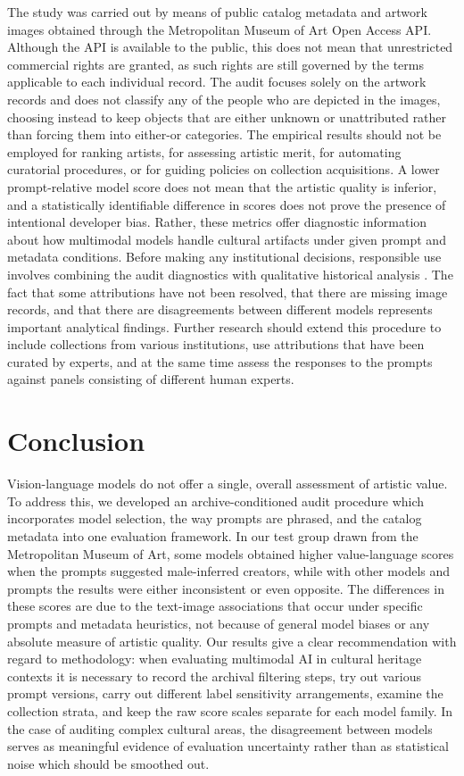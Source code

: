 \documentclass[pdflatex,sn-basic,Numbered]{sn-jnl}
\begin{document}
The study was carried out by means of public catalog metadata and artwork images obtained through the Metropolitan Museum of Art Open Access API. Although the API is available to the public, this does not mean that unrestricted commercial rights are granted, as such rights are still governed by the terms applicable to each individual record. The audit focuses solely on the artwork records and does not classify any of the people who are depicted in the images, choosing instead to keep objects that are either unknown or unattributed rather than forcing them into either-or categories.
The empirical results should not be employed for ranking artists, for assessing artistic merit, for automating curatorial procedures, or for guiding policies on collection acquisitions. A lower prompt-relative model score does not mean that the artistic quality is inferior, and a statistically identifiable difference in scores does not prove the presence of intentional developer bias. Rather, these metrics offer diagnostic information about how multimodal models handle cultural artifacts under given prompt and metadata conditions. Before making any institutional decisions, responsible use involves combining the audit diagnostics with qualitative historical analysis \cite{jobin2019global, stahl2021responsible}.
The fact that some attributions have not been resolved, that there are missing image records, and that there are disagreements between different models represents important analytical findings. Further research should extend this procedure to include collections from various institutions, use attributions that have been curated by experts, and at the same time assess the responses to the prompts against panels consisting of different human experts.


\section{Conclusion}
\label{sec:conclusion}

Vision-language models do not offer a single, overall assessment of artistic value. To address this, we developed an archive-conditioned audit procedure which incorporates model selection, the way prompts are phrased, and the catalog metadata into one evaluation framework. In our test group drawn from the Metropolitan Museum of Art, some models obtained higher value-language scores when the prompts suggested male-inferred creators, while with other models and prompts the results were either inconsistent or even opposite. The differences in these scores are due to the text-image associations that occur under specific prompts and metadata heuristics, not because of general model biases or any absolute measure of artistic quality.
Our results give a clear recommendation with regard to methodology: when evaluating multimodal AI in cultural heritage contexts it is necessary to record the archival filtering steps, try out various prompt versions, carry out different label sensitivity arrangements, examine the collection strata, and keep the raw score scales separate for each model family. In the case of auditing complex cultural areas, the disagreement between models serves as meaningful evidence of evaluation uncertainty rather than as statistical noise which should be smoothed out.
\end{document}
